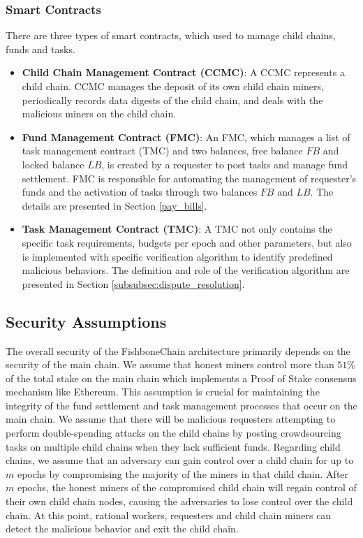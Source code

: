 \documentclass[10pt,journal]{IEEEtran}
\begin{document}
\subsubsection{\textbf{Smart Contracts}}\label{subsub:smartcontract}
There are three types of smart contracts, which used to manage child chains, funds and tasks.
\begin{itemize}
    \item \textbf{Child Chain Management Contract (CCMC)}:
    A CCMC represents a child chain. CCMC manages the deposit of its own child chain miners, periodically records data digests of the child chain, and deals with the malicious miners on the child chain.

    \item \textbf{Fund Management Contract (FMC)}: An FMC, which manages a list of task management contract (TMC) and two balances, free balance $FB$ and locked balance $LB$, is created by a requester to post tasks and manage fund settlement. FMC is responsible for automating the management of requester's funds and the activation of tasks through two balances $FB$ and $LB$. The details are presented in Section \ref{pay_bills}.
    \item \textbf{Task Management Contract (TMC)}: A TMC not only contains the specific task requirements, budgets per epoch and other parameters, but also is implemented with specific verification algorithm to identify predefined malicious behaviors. The definition and role of the verification algorithm are presented in Section \ref{subsubsec:dispute_resolution}.
\end{itemize}


\subsection{Security Assumptions}\label{subsec:security_assumption}
    The overall security of the FishboneChain architecture primarily depends on the security of the main chain. We assume that honest miners control more than $51\%$ of the total stake on the main chain which implements a Proof of Stake consensus mechanism like Ethereum. This assumption is crucial for maintaining the integrity of the fund settlement and task management processes that occur on the main chain. We assume that there will be malicious requesters attempting to perform double-spending attacks on the child chains by posting crowdsourcing tasks on multiple child chains when they lack sufficient funds. Regarding child chains, we assume that an adversary can gain control over a child chain for up to $m$ epochs by compromising the majority of the miners in that child chain. After $m$ epochs, the honest miners of the compromised child chain will regain control of their own child chain nodes, causing the adversaries to lose control over the child chain. At this point, rational workers, requesters and child chain miners can detect the malicious behavior and exit the child chain.
\end{document}

